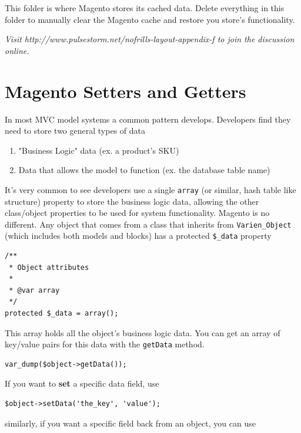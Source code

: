 \documentclass[oneside]{book}
\begin{document}
This folder is where Magento stores its cached data. Delete everything in this folder to manually clear the Magento cache and restore you store's functionality. 

\emph{Visit http://www.pulsestorm.net/nofrills-layout-appendix-f to join the discussion online.}
\chapter{Magento Setters and Getters}
In most MVC model systems a common pattern develops.  Developers find they need to store two general types of data

\begin{enumerate}
\item "Business Logic" data (ex. a product's SKU)
\item Data that allows the model to function (ex. the database table name)
\end{enumerate}


It's very common to see developers use a single \footnotesize\texttt{array} \normalsize  (or similar, hash table like structure) property to store the business logic data, allowing the other class/object properties to be used for system functionality.  Magento is no different.  Any object that comes from a class that inherits from \footnotesize\texttt{Varien\_Object} \normalsize  (which includes both models and blocks) has a protected \footnotesize\texttt{\$\_data} \normalsize  property

\begin{lstlisting}
/**
 * Object attributes
 *
 * @var array
 */
protected $_data = array();

\end{lstlisting}


This array holds all the object's business logic data.  You can get an array of key/value pairs for this data with the \footnotesize\texttt{getData} \normalsize  method.

\begin{lstlisting}
var_dump($object->getData());

\end{lstlisting}


If you want to \textbf{set} a specific data field, use

\begin{lstlisting}
$object->setData('the_key', 'value');

\end{lstlisting}


similarly, if you want a specific field back from an object, you can use
\end{document}
